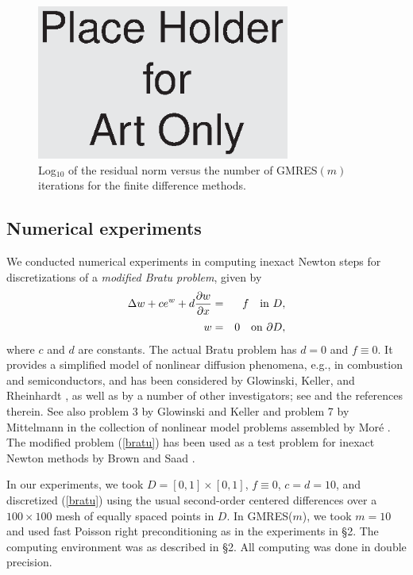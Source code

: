 \documentclass{SIAMGHbook2016}
\def\ds{\displaystyle}
\def\gmres{{GMRES}}
\begin{document}
\begin{figure}
\centerline{\includegraphics[height=2in]{box.eps}}
\caption{{\rm Log}$_{10}$ of the residual norm versus the number of
{\rm GMRES$(m)$} iterations for the finite difference methods.}
\label{diff}
\end{figure}


\subsection{Numerical experiments}
We conducted numerical experiments
in computing inexact Newton steps for discretizations of a
{\em modified Bratu problem}, given by
\begin{eqnarray}
{\ds \Delta w + c e^w + d{ {\partial w}\over{\partial x} } }
&=&{\ds f \quad {\rm in}\ D, }\nonumber\\[-1.5ex]
\label{bratu} \\[-1.5ex]
{\ds w }&=&{\ds 0 \quad {\rm on}\ \partial D , } \nonumber
\end{eqnarray}
where $c$ and $d$ are constants. The actual Bratu problem has $d=0$ and
$f \equiv0$. It provides a simplified model of nonlinear diffusion
phenomena, e.g., in combustion and semiconductors, and has been
considered by Glowinski, Keller, and Rheinhardt \cite{GloKR85},
as well as by a number of other investigators; see \cite{GloKR85}
and the references therein. See also problem 3 by Glowinski and  Keller
and problem 7 by Mittelmann in the collection of nonlinear model
problems assembled by Mor\'e \cite{More}. The modified problem
(\ref{bratu}) has been used as a test problem for inexact Newton
methods by Brown and Saad \cite{Brown-Saad1}.

In our experiments, we took $D = [0,1]\times[0,1]$, $f \equiv0$,
$c=d=10$, and discretized (\ref{bratu}) using the usual second-order
centered differences over a $100\times100$ mesh of equally
spaced points in $D$. In \gmres($m$), we took $m=10$ and used fast
Poisson right preconditioning as in the experiments in \S2. The computing
environment was as described in \S2. All computing was done
in double precision.
\end{document}
